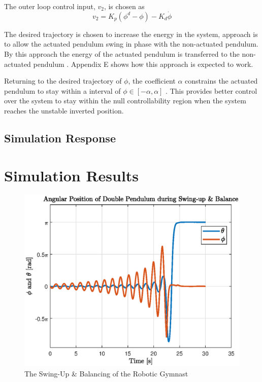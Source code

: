 The outer loop control input, $v_{2}$, is chosen as 
\begin{equation} \label{eq:v2}
v_{2} = K_{p}(\phi^{d}-\phi)-K_{d}\dot{\phi}
\end{equation}

The desired trajectory is chosen to increase the energy in the system, approach is to allow the actuated pendulum swing in phase with the non-actuated pendulum. By this approach the energy of the actuated pendulum is transferred to the non-actuated pendulum \cite{spong_swingup}. Appendix E shows how this approach is expected to work.

Returning to the desired trajectory of $\phi$, the coefficient $\alpha$ constrains the actuated pendulum to stay within a interval of $ \phi \in [-\alpha,\alpha] $ \cite{spong_swingup}. This provides better control over the system to stay within the null controllability region when the system reaches the unstable inverted position.
\subsection{Simulation Response}



\section{Simulation Results}
\begin{figure}[h]
	\centering
	\includegraphics[scale=1]{./figs/swingup_balance}
	\caption{The Swing-Up \& Balancing of the Robotic Gymnast}
	\label{fig:swingup_balance}
\end{figure}